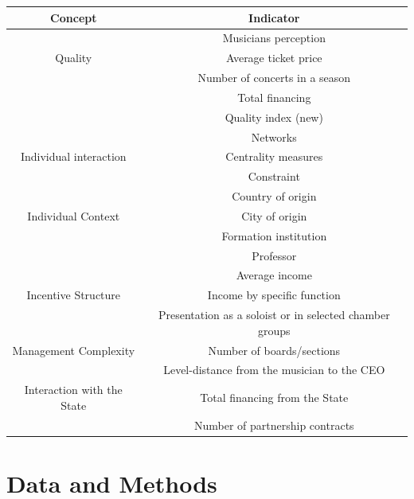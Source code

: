 \documentclass[a4paper, 12pt, openright, oneside, german, french, brazil, english, article]{abntex2}
\begin{document}
	
	\begin{table}[ht]
		{\begin{tabular}{|c|c|}
				
				\hline
				\textbf{Concept} & \textbf{Indicator} \\
				\hline
				&  Musicians perception \\
				Quality  &  Average ticket price \\
				&  Number of concerts in a season \\
				&  Total financing \\
				&  Quality index (new) \\
				\hline
				
				& Networks \\
				Individual interaction & Centrality measures  \\
				& Constraint      \\
				\hline
				& Country of origin  \\
				Individual Context & City of origin  \\
				& Formation institution \\
				& Professor    \\
				\hline
				& Average income  \\
				Incentive Structure & Income by specific function \\
				& Presentation as a soloist or in selected chamber groups \\
				\hline
				Management Complexity  & Number of boards/sections  \\
				& Level-distance from the musician to the CEO \\
				\hline
				Interaction with the State  & Total financing from the State  \\
				& Number of partnership contracts \\
				\hline
				
				
			\end{tabular}
		}
		{}
		
	\end{table}
	
	
	\section{Data and Methods}
	
	
	
\end{document}
